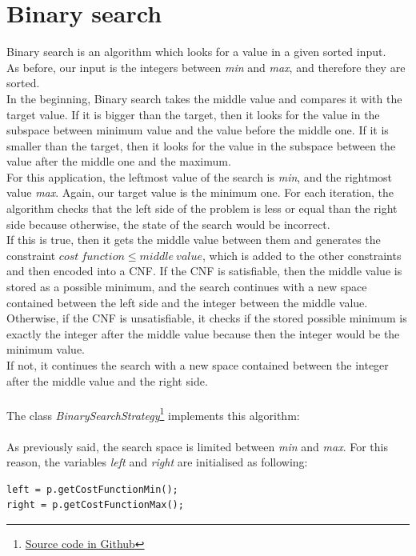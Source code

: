 \section{Binary search}
Binary search is an algorithm which looks for a value in a given sorted input.\\
As before, our input is the integers between \emph{min} and \emph{max}, and therefore they are sorted.\\
In the beginning, Binary search takes the middle value and compares it with the target value. If it is bigger than the target, then it looks for the value in the subspace between minimum value and the value before the middle one. If it is smaller than the target, then it looks for the value in the subspace between the value after the middle one and the maximum.\\
For this application, the leftmost value of the search is \emph{min}, and the rightmost value \emph{max}. Again, our target value is the minimum one. For each iteration, the algorithm checks that the left side of the problem is less or equal than the right side because otherwise, the state of the search would be incorrect. \\
If this is true, then it gets the middle value between them and generates the constraint $cost \ function \leq middle \ value$, which is added to the other constraints and then encoded into a CNF. If the CNF is satisfiable, then the middle value is stored as a possible minimum, and the search continues with a new space contained between the left side and the integer between the middle value. Otherwise, if the CNF is unsatisfiable, it checks if the stored possible minimum is exactly the integer after the middle value because then the integer would be the minimum value.\\
If not, it continues the search with a new space contained between the integer after the middle value and the right side.\\\\
The class \emph{BinarySearchStrategy}\footnote{\href{https://github.com/marcbenedi/SAT-tfg/blob/master/source_files/BinarySearchStrategy.cpp}{Source code in Github}} implements this algorithm:\\\\
As previously said, the search space is limited between \emph{min} and \emph{max}. For this reason, the variables \emph{left} and \emph{right} are initialised as following:
\begin{verbatim}
left = p.getCostFunctionMin();
right = p.getCostFunctionMax();
\end{verbatim}
